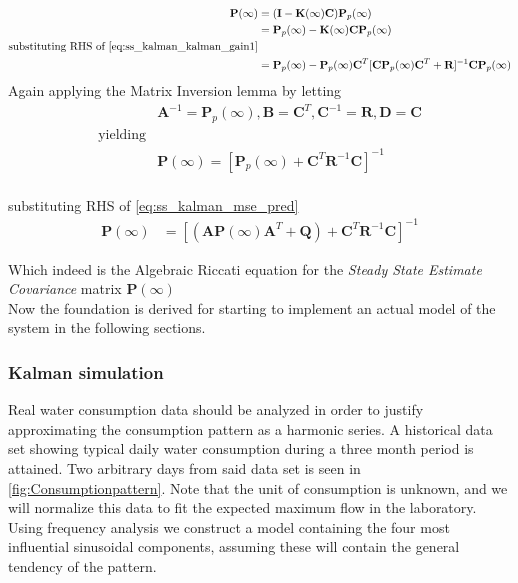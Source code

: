 \begin{equation}
	\begin{split}\label{eq:ss_kalman_udledning5}
	 	\textbf{P}(\infty) 	& = (\textbf{I} - \textbf{K}(\infty) \textbf{C}) \textbf{P}_p(\infty) \\ %
		& = \textbf{P}_p(\infty) - \textbf{K}(\infty) \textbf{C}\textbf{P}_p(\infty) \\
		\text{substituting RHS of \cref{eq:ss_kalman_kalman_gain1}} \\
		& = \textbf{P}_p(\infty) - \textbf{P}_p(\infty) \textbf{C}^T [\textbf{C} \textbf{P}_p	(\infty) \textbf{C}^T + \textbf{R}]^{-1}\textbf{C}\textbf{P}_p(\infty) \\
	\end{split}
\end{equation}
Again applying the Matrix Inversion lemma by letting
\begin{equation}
	\begin{split}\label{eq:ss_kalman_udledning5}
		&\textbf{A}^{-1} = \textbf{P}_p(\infty), \textbf{B} = \textbf{C}^T, \textbf{C}^{-1} = \textbf{R}, \textbf{D} = \textbf{C} \\
		\text{yielding} \\
		&\textbf{P}(\infty) = [\textbf{P}_p(\infty) + \textbf{C}^T\textbf{R}^{-1}\textbf{C}]^{-1} \\ 
	\end{split}
\end{equation}     

substituting RHS of \cref{eq:ss_kalman_mse_pred}
\begin{align}
		\textbf{P}(\infty) & = [(\textbf{A}\textbf{P}(\infty)\textbf{A}^T + \textbf{Q}) + \textbf{C}^T\textbf{R}^{-1}\textbf{C}]^{-1}  \label{eq:ss_kalman_udledning6}
\end{align}

Which indeed is the Algebraic Riccati equation for the \textit{Steady State Estimate Covariance} matrix $\textbf{P}(\infty)$\\
Now the foundation is derived for starting to implement an actual model of the system in the following sections.

\subsubsection{Kalman simulation}
Real water consumption data should be analyzed in order to justify approximating the consumption pattern as a harmonic series. A historical data set showing typical daily water consumption during a three month period is attained. Two arbitrary days from said data set is seen in \cref{fig:Consumptionpattern}. Note that the unit of consumption is unknown, and we will normalize this data to fit the expected maximum flow in the laboratory.  Using frequency analysis we construct a model containing the four most influential sinusoidal components, assuming these will contain the general tendency of the pattern.


